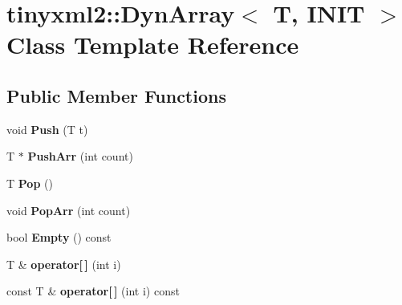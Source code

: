 \hypertarget{classtinyxml2_1_1_dyn_array}{\section{tinyxml2\-:\-:Dyn\-Array$<$ T, I\-N\-I\-T $>$ Class Template Reference}
\label{classtinyxml2_1_1_dyn_array}
}
\subsection*{Public Member Functions}
\begin{DoxyCompactItemize}
\item 
\hypertarget{classtinyxml2_1_1_dyn_array_a498de53808ba0151fef54ea10bf51050}{void {\bfseries Push} (T t)}\label{classtinyxml2_1_1_dyn_array_a498de53808ba0151fef54ea10bf51050}

\item 
\hypertarget{classtinyxml2_1_1_dyn_array_aa3c360d40addc3b05121da9f60a01b4d}{T $\ast$ {\bfseries Push\-Arr} (int count)}\label{classtinyxml2_1_1_dyn_array_aa3c360d40addc3b05121da9f60a01b4d}

\item 
\hypertarget{classtinyxml2_1_1_dyn_array_a2281e3342bc235bf391a67e362c75866}{T {\bfseries Pop} ()}\label{classtinyxml2_1_1_dyn_array_a2281e3342bc235bf391a67e362c75866}

\item 
\hypertarget{classtinyxml2_1_1_dyn_array_ab45c0836d8c0260a5b9eda7da80de71c}{void {\bfseries Pop\-Arr} (int count)}\label{classtinyxml2_1_1_dyn_array_ab45c0836d8c0260a5b9eda7da80de71c}

\item 
\hypertarget{classtinyxml2_1_1_dyn_array_a080dc4dc68713964bb17745d4c833158}{bool {\bfseries Empty} () const }\label{classtinyxml2_1_1_dyn_array_a080dc4dc68713964bb17745d4c833158}

\item 
\hypertarget{classtinyxml2_1_1_dyn_array_a775a6ab4d41f0eb15bdd863d408dd58f}{T \& {\bfseries operator\mbox{[}$\,$\mbox{]}} (int i)}\label{classtinyxml2_1_1_dyn_array_a775a6ab4d41f0eb15bdd863d408dd58f}

\item 
\hypertarget{classtinyxml2_1_1_dyn_array_a1f4874c2608cbd68be1627fca9efd820}{const T \& {\bfseries operator\mbox{[}$\,$\mbox{]}} (int i) const }\label{classtinyxml2_1_1_dyn_array_a1f4874c2608cbd68be1627fca9efd820}


\end{DoxyCompactItemize}
